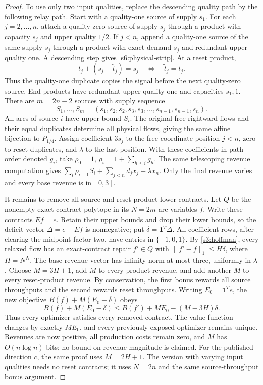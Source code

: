 \begin{proof}
To use only two input qualities, replace the descending quality path by
the following relay path. Start with a quality-one source of supply
$s_1$. For each $j=2,\ldots,n$, attach a quality-zero source of supply
$s_j$ through a product with capacity $s_j$ and upper quality $1/2$.
If $j<n$, append a quality-one source of the same supply $s_j$ through
a product with exact demand $s_j$ and redundant upper quality one.
A descending step gives \eqref{s6:physical-strip}. At a reset product,
\[
 t_j+(s_j-\widetilde t_j)=s_j
 \quad\Longleftrightarrow\quad\widetilde t_j=t_j.
\]
Thus the quality-one duplicate copies the signal before the next
quality-zero source. End products have redundant upper quality one
and capacities $s_1,1$. There are $m=2n-2$ sources with supply sequence
\[
 S_1,\ldots,S_m=(s_1,s_2,s_2,s_3,s_3,\ldots,s_{n-1},s_{n-1},s_n).
\]
All arcs of source $i$ have upper bound $S_i$.
The original free rightward flows and their equal duplicates determine
all physical flows, giving the same affine bijection to $P_{1/4}$.
Assign coefficient $3s_j$ to the free-coordinate position $j<n$,
zero to reset duplicates, and $\lambda$ to the last position.
With these coefficients in path order denoted $g_i$, take
$\rho_0=1$, $\rho_i=1+\sum_{h\le i}g_h$.
The same telescoping revenue computation gives
$\sum_i\rho_{i-1}S_i+\sum_{j<n}d_jx_j+\lambda x_n$.
Only the final revenue varies and every base revenue is in $[0,3]$.

It remains to remove all source and reset-product lower contracts.
Let $Q$ be the nonempty exact-contract polytope in its $N=2m$ arc
variables $f$. Write these contracts $Ef=e$. Retain their upper bounds
and drop their lower bounds, so the deficit vector
$\Delta=e-Ef$ is nonnegative; put $\delta=\mathbf1^T\Delta$.
All coefficient rows, after clearing the midpoint factor two, have
entries in $\{-1,0,1\}$. By \cref{s3:hoffman}, every relaxed flow has
an exact-contract repair $f'\in Q$ with
$\|f'-f\|_1\le H\delta$, where $H=N^N$.
The base revenue vector has infinity norm at most three, uniformly in
$\lambda$. Choose $M=3H+1$, add $M$ to every product revenue, and add
another $M$ to every reset-product revenue. By conservation, the first
bonus rewards all source throughputs and the second rewards reset throughputs.
Writing $E_0=\mathbf1^Te$, the new objective $B(f)+M(E_0-\delta)$ obeys
\[
 B(f)+M(E_0-\delta)
 \le B(f')+ME_0-(M-3H)\delta.
\]
Thus every optimizer satisfies every removed contract. The value function
changes by exactly $ME_0$, and every previously exposed optimizer remains
unique. Revenues are now positive, all production costs remain zero,
and $M$ has $O(n\log n)$ bits; no bound on revenue magnitude is claimed.
For the published direction $c$, the same proof uses $M=2H+1$.
The version with varying input qualities needs no reset contracts; it
uses $N=2n$ and the same source-throughput bonus argument.
\end{proof}

